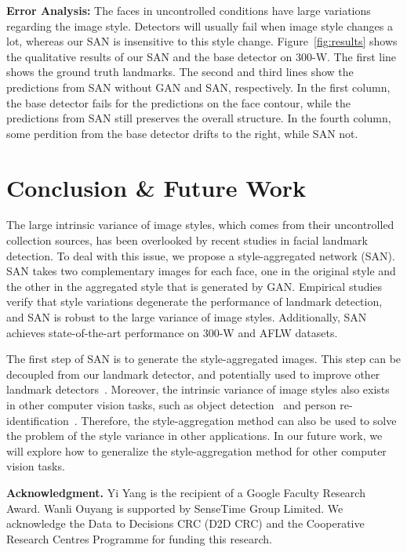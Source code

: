 \documentclass[10pt,twocolumn,letterpaper]{article}
\begin{document}
{\bf Error Analysis:}
The faces in uncontrolled conditions have large variations regarding the image style.
Detectors will usually fail when image style changes a lot, whereas our SAN is insensitive to this style change.
Figure~\ref{fig:results} shows the qualitative results of our SAN and the base detector on 300-W.
The first line shows the ground truth landmarks.
The second and third lines show the predictions from SAN without GAN and SAN, respectively.
In the first column, the base detector fails for the predictions on the face contour, while the predictions from SAN still preserves the overall structure.
In the fourth column, some perdition from the base detector drifts to the right, while SAN not.


\section{Conclusion \& Future Work}
The large intrinsic variance of image styles, which comes from their uncontrolled collection sources, has been overlooked by recent studies in facial landmark detection.
To deal with this issue, we propose a style-aggregated network (SAN).
SAN takes two complementary images for each face, one in the original style and the other in the aggregated style that is generated by GAN.
Empirical studies verify that style variations degenerate the performance of landmark detection, and SAN is robust to the large variance of image styles.
Additionally, SAN achieves state-of-the-art performance on 300-W and AFLW datasets.



The first step of SAN is to generate the style-aggregated images.
This step can be decoupled from our landmark detector, and potentially used to improve other landmark detectors~\cite{cao2014face,ren2016face,zhu2015face,zhang2014facial,ouyang2014multi}.
Moreover, the intrinsic variance of image styles also exists in other computer vision tasks, such as object detection~\cite{dong2017dual,ren2017faster,ouyang2012discriminative,dai2016r,liu2017recurrent} and person re-identification~\cite{wu2018exploit,zhao2013unsupervised,zhong2018camera,ma2017self}.
Therefore, the style-aggregation method can also be used to solve the problem of the style variance in other applications.
In our future work, we will explore how to generalize the style-aggregation method for other computer vision tasks.


{\bf Acknowledgment.} Yi Yang is the recipient of a Google Faculty Research Award.
Wanli Ouyang is supported by SenseTime Group Limited.
We acknowledge the Data to Decisions CRC (D2D CRC) and the Cooperative Research Centres Programme for funding this research.


{\small


}
\end{document}
